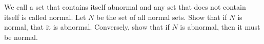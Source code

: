 We call a set that contains itself abnormal and any set that does not contain itself is called normal.
Let $N$ be the set of all normal sets. Show that if $N$ is normal, that it is abnormal. Conversely,
show that if $N$ is abnormal, then it must be normal.\\